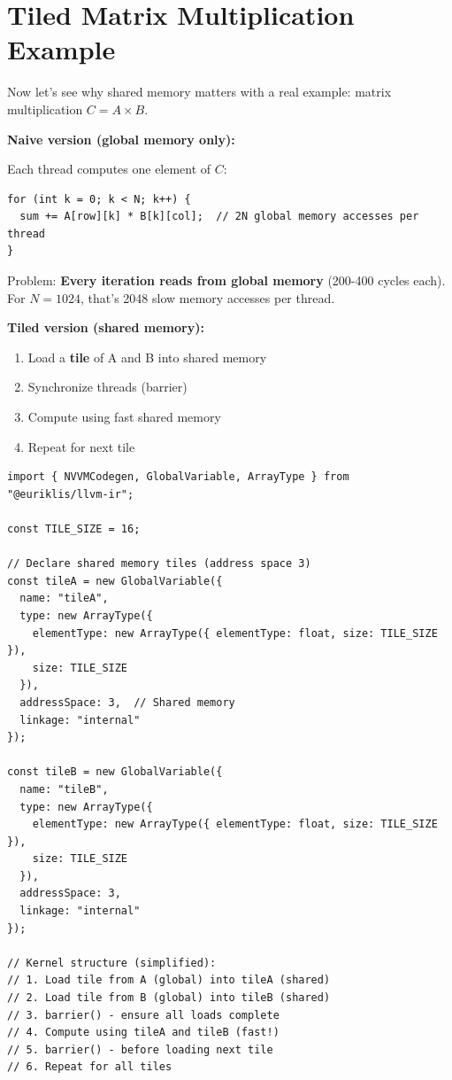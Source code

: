 \section{Tiled Matrix Multiplication Example}

Now let's see why shared memory matters with a real example: matrix multiplication \(C = A \times B\).

\textbf{Naive version (global memory only):}

Each thread computes one element of \(C\):
\begin{lstlisting}[style=ts]
for (int k = 0; k < N; k++) {
  sum += A[row][k] * B[k][col];  // 2N global memory accesses per thread
}
\end{lstlisting}

Problem: \textbf{Every iteration reads from global memory} (200-400 cycles each). For \(N=1024\), that's 2048 slow memory accesses per thread.

\textbf{Tiled version (shared memory):}

\begin{enumerate}[noitemsep]
  \item Load a \textbf{tile} of A and B into shared memory
  \item Synchronize threads (barrier)
  \item Compute using fast shared memory
  \item Repeat for next tile
\end{enumerate}

\begin{lstlisting}[style=ts]
import { NVVMCodegen, GlobalVariable, ArrayType } from "@euriklis/llvm-ir";

const TILE_SIZE = 16;

// Declare shared memory tiles (address space 3)
const tileA = new GlobalVariable({
  name: "tileA",
  type: new ArrayType({
    elementType: new ArrayType({ elementType: float, size: TILE_SIZE }),
    size: TILE_SIZE
  }),
  addressSpace: 3,  // Shared memory
  linkage: "internal"
});

const tileB = new GlobalVariable({
  name: "tileB",
  type: new ArrayType({
    elementType: new ArrayType({ elementType: float, size: TILE_SIZE }),
    size: TILE_SIZE
  }),
  addressSpace: 3,
  linkage: "internal"
});

// Kernel structure (simplified):
// 1. Load tile from A (global) into tileA (shared)
// 2. Load tile from B (global) into tileB (shared)
// 3. barrier() - ensure all loads complete
// 4. Compute using tileA and tileB (fast!)
// 5. barrier() - before loading next tile
// 6. Repeat for all tiles
\end{lstlisting}


